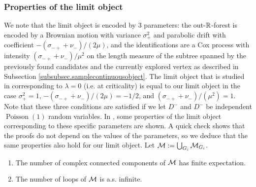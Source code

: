 \subsubsection{Properties of the limit object}
We note that the limit object is encoded by $3$ parameters: the out-${\mathbb R}$-forest is encoded by a Brownian motion with variance $\sigma_+^2$ and parabolic drift with coefficient $-(\sigma_{-+}+\nu_-)/(2\mu)$, and the identifications are a Cox process with intensity $(\sigma_{-+}+\nu_-)/\mu^2$ on the length measure of the subtree spanned by the previously found candidates and the currently explored vertex as described in Subsection \ref{subsubsec.samplecontinuousobject}. The limit object that is studied in \cite{goldschmidtScalingLimitCritical2021} corresponding to $\lambda=0$ (i.e. at criticality) is equal to our limit object in the case $\sigma_+^2=1$, $-(\sigma_{-+}+\nu_-)/(2\mu)=-1/2$, and $(\sigma_{-+}+\nu_-)/(\mu^2)=1$. Note that these three conditions are satisfied if we let $D^-$ and $D^-$ be independent $\operatorname{Poisson}(1)$ random variables. In \cite{goldschmidtScalingLimitCritical2021}, some properties of the limit object corresponding to these specific parameters are shown. A quick check shows that the proofs do not depend on the values of the parameters, so we deduce that the same properties also hold for our limit object. Let ${\mathcal M}:=\bigcup_{G_i}{\mathcal M}_{G_i}$.

\begin{proposition}
\begin{enumerate}
    \item The number of complex connected components of ${\mathcal M}$ has finite expectation.
    \item The number of loops of ${\mathcal M}$ is a.s. infinite.
\end{enumerate}
\end{proposition}

